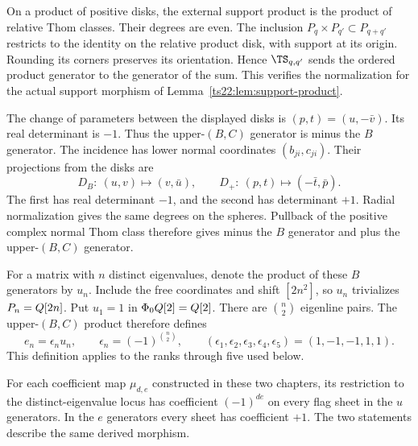 On a product of positive disks, the external support product is the
product of relative Thom classes. Their degrees are even.
The inclusion $P_q\times P_{q'}\subset P_{q+q'}$ restricts to the
identity on the relative product disk, with support at its origin.
Rounding its corners preserves its orientation. Hence
$\TS_{q,q'}$ sends the ordered product generator to the generator
of the sum. This verifies the normalization for the actual support
morphism of Lemma~\ref{ts22:lem:support-product}.

The change of parameters between the displayed disks is
$(p,t)=(u,-\bar v)$. Its real determinant is $-1$.
Thus the upper-$(B,C)$ generator is minus the $B$ generator.
The incidence has lower normal coordinates $(b_{ji},c_{ji})$.
Their projections from the disks are
\[
 D_B:\ (u,v)\longmapsto(v,\bar u),\qquad
 D_+:\ (p,t)\longmapsto(-\bar t,\bar p).
\]
The first has real determinant $-1$, and the second has determinant
$+1$. Radial normalization gives the same degrees on the spheres.
Pullback of the positive complex normal Thom class therefore gives
minus the $B$ generator and plus the upper-$(B,C)$ generator.

For a matrix with $n$ distinct eigenvalues, denote the product of
these $B$ generators by $u_n$. Include the free coordinates and
shift $[2n^2]$, so $u_n$ trivializes $P_n=Q[2n]$.
Put $u_1=1$ in $\Phi_0Q[2]=Q[2]$.
There are $\binom n2$ eigenline pairs. The upper-$(B,C)$ product
therefore defines
\[
 e_n=\epsilon_nu_n,\qquad
 \epsilon_n=(-1)^{\binom n2},\qquad
 (\epsilon_1,\epsilon_2,\epsilon_3,\epsilon_4,\epsilon_5)
       =(1,-1,-1,1,1).
\]
This definition applies to the ranks through five used below.

\begin{proposition}
\label{ts22:prop:normalization}
For each coefficient map $\mu_{d,e}$ constructed in these two chapters,
its restriction to the distinct-eigenvalue locus has coefficient
$(-1)^{de}$ on every flag sheet in the $u$ generators.
In the $e$ generators every sheet has coefficient $+1$.
The two statements describe the same derived morphism.
\end{proposition}

